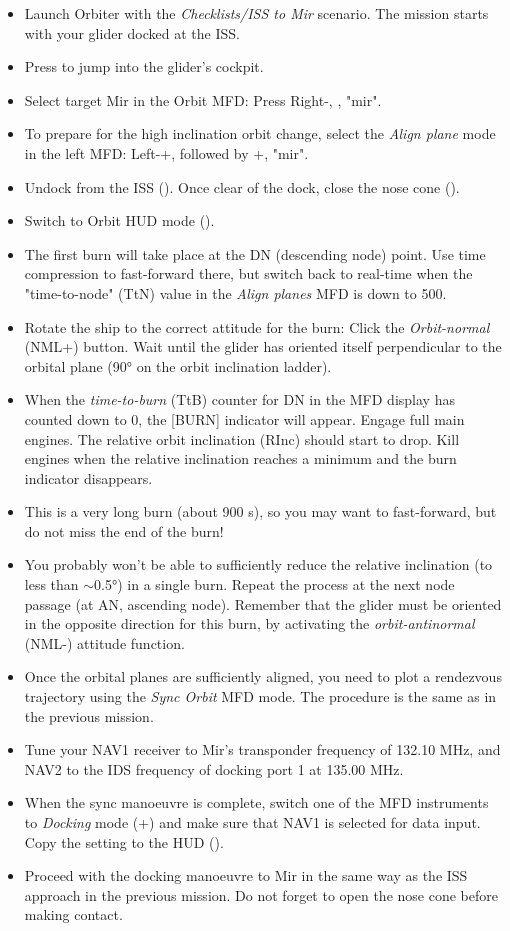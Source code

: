 \documentclass[Orbiter User Manual.tex]{subfiles}
\begin{document}
\begin{itemize}
\item Launch Orbiter with the \textit{Checklists/ISS to Mir} scenario. The mission starts with your glider docked at the ISS.
\item Press  to jump into the glider's cockpit.
\item Select target Mir in the Orbit MFD: Press Right-\Shift{}, \Enter, "mir".
\item To prepare for the high inclination orbit change, select the \textit{Align plane} mode in the left MFD: Left-\Shift{}+\Shift{}, followed by \Shift{}+\Enter, "mir".
\item Undock from the ISS (\Ctrl{}). Once clear of the dock, close the nose cone ().
\item Switch to Orbit HUD mode ().
\item The first burn will take place at the DN (descending node) point. Use time compression to fast-forward there, but switch back to real-time when the "time-to-node" (TtN) value in the \textit{Align planes} MFD is down to 500.
\item Rotate the ship to the correct attitude for the burn: Click the \textit{Orbit-normal} (NML+) button. Wait until the glider has oriented itself perpendicular to the orbital plane (90° on the orbit inclination ladder).
\item When the \textit{time-to-burn} (TtB) counter for DN in the MFD display has counted down to 0, the [BURN] indicator will appear. Engage full main engines. The relative orbit inclination (RInc) should start to drop. Kill engines when the relative inclination reaches a minimum and the burn indicator disappears.
\item This is a very long burn (about 900 s), so you may want to fast-forward, but do not miss the end of the burn!
\item You probably won't be able to sufficiently reduce the relative inclination (to less than $\sim$0.5°) in a single burn. Repeat the process at the next node passage (at AN, ascending node). Remember that the glider must be oriented in the opposite direction for this burn, by activating the \textit{orbit-antinormal} (NML-) attitude function.
\item Once the orbital planes are sufficiently aligned, you need to plot a rendezvous trajectory using the \textit{Sync Orbit} MFD mode. The procedure is the same as in the previous mission.
\item Tune your NAV1 receiver to Mir's transponder frequency of 132.10 MHz, and NAV2 to the IDS frequency of docking port 1 at 135.00 MHz.
\item When the sync manoeuvre is complete, switch one of the MFD instruments to \textit{Docking} mode (\Shift{}+\Shift{}) and make sure that NAV1 is selected for data input. Copy the setting to the HUD (\Shift{}).
\item Proceed with the docking manoeuvre to Mir in the same way as the ISS approach in the previous mission. Do not forget to open the nose cone before making contact.
\end{itemize}
\end{document}
